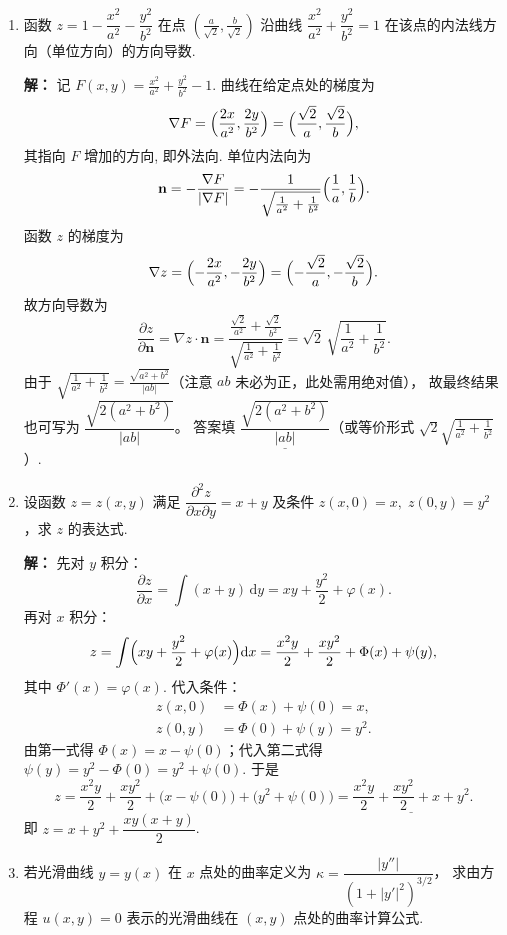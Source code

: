 \begin{enumerate}
\item
函数 $z = 1 - \dfrac{x^2}{a^2} - \dfrac{y^2}{b^2}$ 在点 $\displaystyle\left(\frac{a}{\sqrt{2}},\frac{b}{\sqrt{2}}\right)$ 沿曲线
$\dfrac{x^2}{a^2}+\dfrac{y^2}{b^2}=1$ 在该点的内法线方向（单位方向）的方向导数.

\textbf{解：}
记 $\displaystyle F(x,y)=\frac{x^2}{a^2}+\frac{y^2}{b^2}-1$. 曲线在给定点处的梯度为
\[
\nabla F = \Bigl(\frac{2x}{a^2},\frac{2y}{b^2}\Bigr)
= \Bigl(\frac{\sqrt{2}}{a},\frac{\sqrt{2}}{b}\Bigr),
\]
其指向 $F$ 增加的方向, 即外法向. 单位内法向为
\[
\mathbf{n} = -\frac{\nabla F}{|\nabla F|}
= -\frac{1}{\sqrt{\frac{1}{a^2}+\frac{1}{b^2}}}\Bigl(\frac{1}{a},\frac{1}{b}\Bigr).
\]
函数 $z$ 的梯度为
\[
\nabla z = \Bigl(-\frac{2x}{a^2},-\frac{2y}{b^2}\Bigr)
= \Bigl(-\frac{\sqrt{2}}{a},-\frac{\sqrt{2}}{b}\Bigr).
\]
故方向导数为
\[
\frac{\partial z}{\partial \mathbf{n}} = \nabla z \cdot \mathbf{n}
= \frac{\frac{\sqrt{2}}{a^2}+\frac{\sqrt{2}}{b^2}}{\sqrt{\frac{1}{a^2}+\frac{1}{b^2}}}
= \sqrt{2}\,\sqrt{\frac{1}{a^2}+\frac{1}{b^2}}.
\]
由于 $\displaystyle \sqrt{\frac{1}{a^2}+\frac{1}{b^2}} = \frac{\sqrt{a^2+b^2}}{|ab|}$（注意 $ab$ 未必为正，此处需用绝对值），
故最终结果也可写为 $\dfrac{\sqrt{2(a^2+b^2)}}{|ab|}$。
答案填 $\underline{\dfrac{\sqrt{2(a^2+b^2)}}{|ab|}}$（或等价形式 $\displaystyle\sqrt{2}\sqrt{\frac{1}{a^2}+\frac{1}{b^2}}$）.

\item
设函数 $z=z(x,y)$ 满足 $\dfrac{\partial^2 z}{\partial x\partial y}=x+y$ 及条件
$z(x,0)=x,\;z(0,y)=y^2$，求 $z$ 的表达式.

\textbf{解：}
先对 $y$ 积分：
\[
\frac{\partial z}{\partial x} = \int (x+y)\,\mathrm{d}y = xy + \frac{y^2}{2} + \varphi(x).
\]
再对 $x$ 积分：
\[
z = \int \Bigl(xy + \frac{y^2}{2} + \varphi(x)\Bigr)\mathrm{d}x
= \frac{x^2y}{2} + \frac{xy^2}{2} + \Phi(x) + \psi(y),
\]
其中 $\Phi'(x)=\varphi(x)$.
代入条件：
\begin{align*}
z(x,0) &= \Phi(x) + \psi(0) = x,\\
z(0,y) &= \Phi(0) + \psi(y) = y^2.
\end{align*}
由第一式得 $\Phi(x) = x - \psi(0)$；代入第二式得
$\psi(y) = y^2 - \Phi(0) = y^2 + \psi(0)$.
于是
\[
z = \frac{x^2y}{2} + \frac{xy^2}{2} + \bigl(x - \psi(0)\bigr) + \bigl(y^2 + \psi(0)\bigr)
= \underline{\frac{x^2y}{2} + \frac{xy^2}{2} + x + y^2}.
\]
即 $z = x + y^2 + \dfrac{xy(x+y)}{2}$.

\item
若光滑曲线 $y=y(x)$ 在 $x$ 点处的曲率定义为 $\kappa = \dfrac{|y''|}{(1+|y'|^2)^{3/2}}$，
求由方程 $u(x,y)=0$ 表示的光滑曲线在 $(x,y)$ 点处的曲率计算公式.


\end{enumerate}
